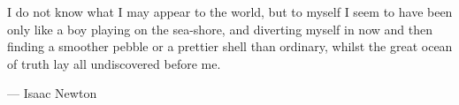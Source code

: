 

\vspace*{200pt}
\epigraph {I do not know what I may appear to the world, but to myself I seem to have been
only like a boy playing on the sea-shore, and diverting myself in now and then finding a
smoother pebble or a prettier shell than ordinary, whilst the great ocean of truth lay all
undiscovered before me.}{— Isaac Newton}
